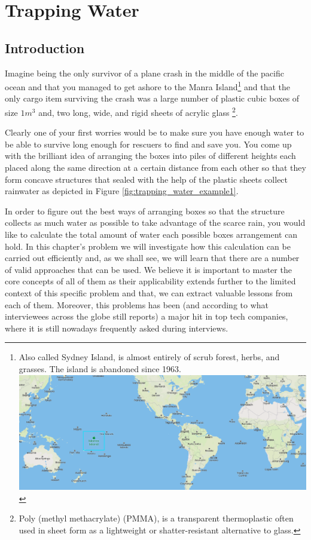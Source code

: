%

\chapter{Trapping Water}
\label{ch:trapping_water}
\section*{Introduction}
Imagine being the only survivor of a plane crash in the middle of the pacific ocean and that you managed to get ashore to the Manra Island\footnote{Also called Sydney Island, is almost entirely of scrub forest, herbs, and grasses. The island is abandoned since 1963. 
\includegraphics[]{sources/trapping_water/images/manra_island}} 
and that the only cargo item surviving the crash was a large number of plastic cubic boxes of size $1m^3$ and, two long, wide, and rigid sheets of acrylic glass \footnote{Poly (methyl methacrylate) (PMMA), is a transparent thermoplastic often used in sheet form as a lightweight or shatter-resistant alternative to glass.}.

Clearly one of your first worries would be to make sure you have enough water to be able to survive long enough for rescuers to find and save you.
You come up with the brilliant idea of arranging the boxes into piles of different heights each placed along the same direction  
at a certain distance from each other so that they form concave structures that sealed with the help of the plastic sheets collect rainwater as depicted in Figure \ref{fig:trapping_water_example1}. 

In order to figure out the best ways of arranging boxes so that the structure collects as much water as possible to take advantage of the scarce rain, you would like to calculate the total amount of water each possible boxes arrangement can hold.
In this chapter's problem we will investigate how this calculation can be carried out efficiently and, as we shall see, we will learn that there are a number of valid approaches that can be used.
We believe it is important to master the core concepts of all of them as their applicability extends further to the limited context of this specific problem and that, we can extract valuable lessons from each of them.
Moreover, this problems has been (and according to what interviewees across the globe still reports) a major hit in top tech companies, where it is still nowadays frequently asked during interviews.


